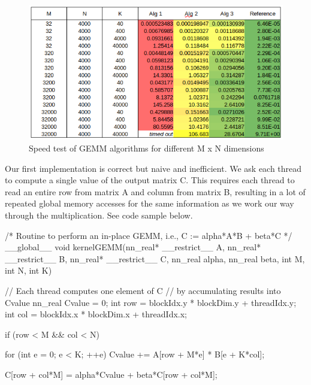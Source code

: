 \documentclass[12pt,letterpaper,twoside]{article}
\begin{document}
\begin{figure}[!htbp]
    \centering
    \includegraphics[scale=0.7]{speed_alg_vs_dimensions.png}
    \caption{Speed test of GEMM algorithms for different M x N dimensions}
\end{figure}

Our first implementation is correct but naive and inefficient. We ask each thread to 
compute a single value of the output matrix C. This requires each thread to read an 
entire row from matrix A and column from matrix B, resulting in a lot of repeated 
global memory accesses for the same information as we work our way through the 
multiplication. See code sample below.

\begin{cpp}
/* 
Routine to perform an in-place GEMM, i.e., C := alpha*A*B + beta*C
*/
__global__ 
void kernelGEMM(nn_real* __restrict__ A, nn_real* __restrict__ B, 
        nn_real* __restrict__ C, nn_real alpha, nn_real beta, 
            int M, int N, int K) 
{
    // Each thread computes one element of C
    // by accumulating results into Cvalue
    nn_real Cvalue = 0;
    int row = blockIdx.y * blockDim.y + threadIdx.y;
    int col = blockIdx.x * blockDim.x + threadIdx.x;

    if (row < M && col < N) 
    {
        for (int e = 0; e < K; ++e) 
        Cvalue += A[row + M*e] * B[e +  K*col];	
        
    C[row + col*M] = alpha*Cvalue + beta*C[row + col*M];
    }
}
\end{cpp}
\end{document}
